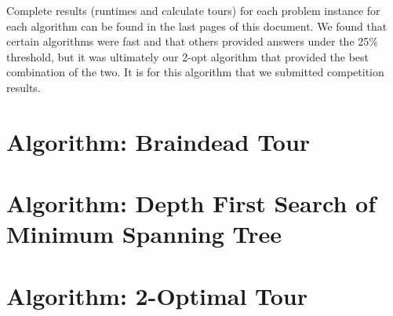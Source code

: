\documentclass[12pt]{article}
\begin{document}
Complete results (runtimes and calculate tours) for each problem instance for each algorithm can be found in the last pages of this document.  We found that certain algorithms were fast and that others provided answers under the 25\% threshold, but it was ultimately our 2-opt algorithm that provided the best combination of the two.  It is for this algorithm that we submitted competition results.

\newpage
\section*{Algorithm: Braindead Tour}


\newpage
\section*{Algorithm: Depth First Search of Minimum Spanning Tree}


\newpage
\section*{Algorithm: 2-Optimal Tour}


% 




\end{document}
